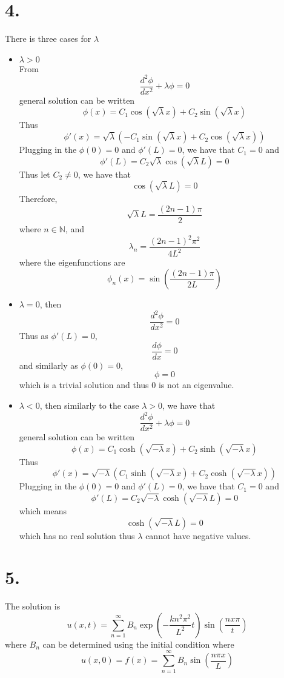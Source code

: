 \documentclass[11pt]{article}
\theoremstyle{mystyle}
\theoremstyle{definition}
\begin{document}
\section*{4.}
There is three cases for $\lambda$ 
\begin{itemize}
  \item $\lambda > 0$ \\
    From 
    \[
      \displaystyle\frac{d^2 \phi}{dx^2} + \lambda \phi = 0
    \] general solution can be written 
    \[
      \phi(x) = C_1 \cos(\sqrt{\lambda}x) + C_2 \sin(\sqrt{\lambda}x)
    \]
    Thus 
    \[
      \phi'(x) = \sqrt{\lambda} (-C_1\sin(\sqrt{\lambda}x) + C_2 \cos(\sqrt{\lambda}x))
    \]
    Plugging in the $\phi(0) = 0$ and $\phi'(L) = 0$, we have that $C_1 = 0$ and 
    \[
      \phi'(L) = C_2 \sqrt{\lambda} \cos(\sqrt{\lambda}L) = 0
    \]
    Thus let $C_2 \ne 0$, we have that 
    \[
      \cos(\sqrt{\lambda}L) = 0 
    \]
    Therefore,
    \[
      \sqrt{\lambda} L = \displaystyle\frac{(2n-1)\pi}{2}
    \]
    where $n \in \mathbb{N}$, 
    and 
    \[
      \lambda_n = \displaystyle\frac{(2n-1)^2 \pi^2}{4L^2}
    \]
    where the eigenfunctions are 
    \[
      \phi_n(x) = \sin \left( \displaystyle\frac{(2n-1)\pi}{2L} \right)
    \]
  \item $\lambda = 0$, then 
    \[
      \displaystyle\frac{d^2 \phi}{dx^2} = 0
    \]
    Thus as $\phi'(L) = 0$, 
    \[
      \displaystyle\frac{d \phi}{dx} = 0
    \]
    and similarly as $\phi(0) = 0$, 
    \[
      \phi = 0
    \]
    which is a trivial solution and thus 0 is not an eigenvalue.
  \item $\lambda < 0$, then similarly to the case $\lambda > 0$, we have that 
    \[
      \displaystyle\frac{d^2 \phi}{dx^2} + \lambda \phi = 0
    \] general solution can be written 
    \[
      \phi(x) = C_1 \cosh(\sqrt{-\lambda}x) + C_2 \sinh(\sqrt{-\lambda}x)
    \]
    Thus 
    \[
      \phi'(x) = \sqrt{-\lambda} (C_1\sinh(\sqrt{-\lambda}x) + C_2 \cosh(\sqrt{-\lambda}x))
    \]
    Plugging in the $\phi(0) = 0$ and $\phi'(L) = 0$, we have that $C_1 = 0$ and 
    \[
      \phi'(L) = C_2 \sqrt{-\lambda} \cosh(\sqrt{-\lambda}L) = 0
    \]
    which means 
    \[
      \cosh(\sqrt{-\lambda}L) = 0
    \]
    which has no real solution thus $\lambda$ cannot have negative values. 
\end{itemize}
\newpage
\section*{5.}
The solution is 
\[
  u(x,t) = \sum_{n=1}^\infty B_n \exp\left(- \displaystyle\frac{kn^2\pi^2}{L^2}t\right) \sin\left( \displaystyle\frac{nx\pi}{t}\right)
\]
where $B_n$ can be determined using the initial condition where
\[
  u(x,0) = f(x) = \sum_{n=1}^\infty B_n \sin\left( \displaystyle\frac{n\pi x}{L} \right)
\]
\end{document}
